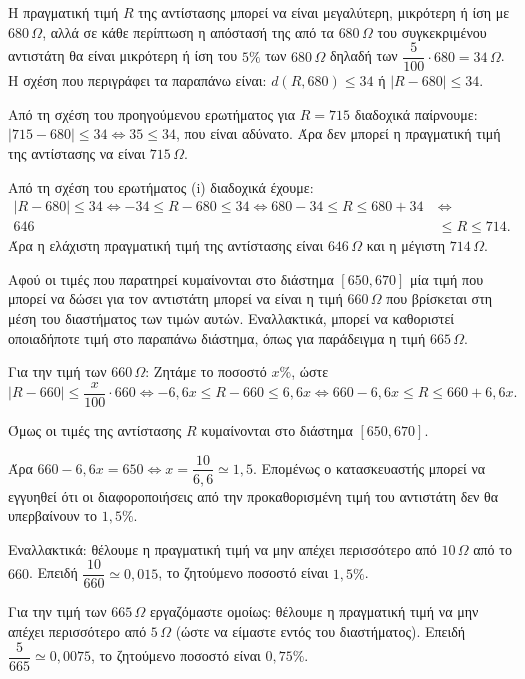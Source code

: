 
\begin{alist}
\item
\begin{rlist}
\item Η πραγματική τιμή $R$ της αντίστασης μπορεί να είναι μεγαλύτερη, μικρότερη ή ίση με $680\,\Omega$, αλλά σε κάθε περίπτωση η απόστασή της από τα $680\,\Omega$ του συγκεκριμένου αντιστάτη θα είναι μικρότερη ή ίση του $5\%$ των $680\,\Omega$ δηλαδή των $\dfrac{5}{100} \cdot 680 = 34\,\Omega$.
Η σχέση που περιγράφει τα παραπάνω είναι: $d(R, 680) \le 34$ ή $|R - 680| \le 34$.

\item Από τη σχέση του προηγούμενου ερωτήματος για $R = 715$ διαδοχικά παίρνουμε:
$|715 - 680| \le 34 \Leftrightarrow 35 \le 34$, που είναι αδύνατο. Άρα δεν μπορεί η πραγματική τιμή της αντίστασης να είναι $715\,\Omega$.

\item Από τη σχέση του ερωτήματος (i) διαδοχικά έχουμε:
\begin{align*}
|R - 680| \le 34 \Leftrightarrow -34 \le R - 680 \le 34 \Leftrightarrow 680 - 34 \le R \le 680 + 34 \ &\Leftrightarrow \\
646 &\le R \le 714.
\end{align*}
Άρα η ελάχιστη πραγματική τιμή της αντίστασης είναι $646\,\Omega$ και η μέγιστη $714\,\Omega$.
\end{rlist}

\item
\begin{rlist}
\item Αφού οι τιμές που παρατηρεί κυμαίνονται στο διάστημα $[650, 670]$ μία τιμή που μπορεί να δώσει για τον αντιστάτη μπορεί να είναι η τιμή $660\,\Omega$ που βρίσκεται στη μέση του διαστήματος των τιμών αυτών. Εναλλακτικά, μπορεί να καθοριστεί οποιαδήποτε τιμή στο παραπάνω διάστημα, όπως για παράδειγμα η τιμή $665\,\Omega$.

\item Για την τιμή των $660\,\Omega$: Ζητάμε το ποσοστό $x\%$, ώστε
\[|R - 660| \le \dfrac{x}{100} \cdot 660 \Leftrightarrow -6,6x \le R - 660 \le 6,6x \Leftrightarrow 660 - 6,6x \le R \le 660 + 6,6x.\]

Όμως οι τιμές της αντίστασης $R$ κυμαίνονται στο διάστημα $[650, 670]$.

Άρα $660 - 6,6x = 650 \Leftrightarrow x = \dfrac{10}{6,6} \simeq 1,5$. Επομένως ο κατασκευαστής μπορεί να εγγυηθεί ότι οι διαφοροποιήσεις από την προκαθορισμένη τιμή του αντιστάτη δεν θα υπερβαίνουν το $1,5\%$.

Εναλλακτικά: θέλουμε η πραγματική τιμή να μην απέχει περισσότερο από $10\,\Omega$ από το $660$. Επειδή $\dfrac{10}{660} \simeq 0,015$, το ζητούμενο ποσοστό είναι $1,5\%$.

Για την τιμή των $665\,\Omega$ εργαζόμαστε ομοίως: θέλουμε η πραγματική τιμή να μην απέχει περισσότερο από $5\,\Omega$ (ώστε να είμαστε εντός του διαστήματος). Επειδή $\dfrac{5}{665} \simeq 0,0075$, το ζητούμενο ποσοστό είναι $0,75\%$.
\end{rlist}
\end{alist}

